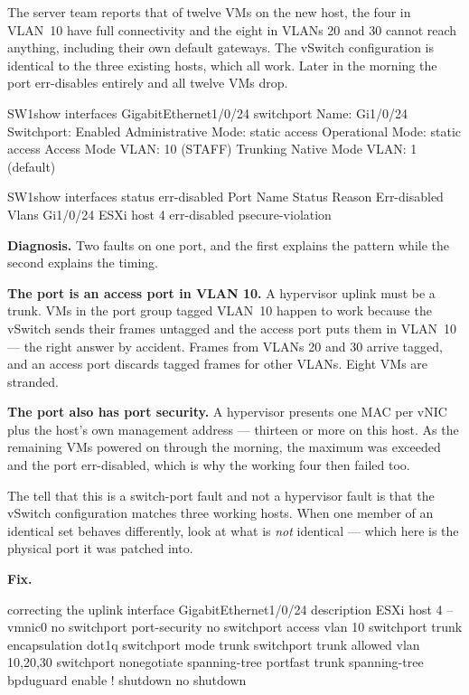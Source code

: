 \begin{breakfix}
The server team reports that of twelve VMs on the new host, the four in VLAN~10
have full connectivity and the eight in VLANs 20 and 30 cannot reach anything,
including their own default gateways. The vSwitch configuration is identical to
the three existing hosts, which all work. Later in the morning the port
err-disables entirely and all twelve VMs drop.

\begin{verify}{SW1}{show interfaces GigabitEthernet1/0/24 switchport}
Name: Gi1/0/24
Switchport: Enabled
Administrative Mode: static access
Operational Mode: static access
Access Mode VLAN: 10 (STAFF)
Trunking Native Mode VLAN: 1 (default)
\end{verify}

\begin{verify}{SW1}{show interfaces status err-disabled}
Port      Name               Status       Reason               Err-disabled Vlans
Gi1/0/24  ESXi host 4        err-disabled psecure-violation
\end{verify}

\textbf{Diagnosis.} Two faults on one port, and the first explains the pattern
while the second explains the timing.

\textbf{The port is an access port in VLAN 10.} A hypervisor uplink must be a
trunk. VMs in the port group tagged VLAN~10 happen to work because the vSwitch
sends their frames untagged and the access port puts them in VLAN~10 --- the
right answer by accident. Frames from VLANs 20 and 30 arrive tagged, and an
access port discards tagged frames for other VLANs. Eight VMs are stranded.

\textbf{The port also has port security.} A hypervisor presents one MAC per vNIC
plus the host's own management address --- thirteen or more on this host. As the
remaining VMs powered on through the morning, the maximum was exceeded and the
port err-disabled, which is why the working four then failed too.

The tell that this is a switch-port fault and not a hypervisor fault is that the
vSwitch configuration matches three working hosts. When one member of an
identical set behaves differently, look at what is \emph{not} identical --- which
here is the physical port it was patched into.

\textbf{Fix.}

\begin{config}{correcting the uplink}
interface GigabitEthernet1/0/24
 description ESXi host 4 -- vmnic0
 no switchport port-security
 no switchport access vlan 10
 switchport trunk encapsulation dot1q
 switchport mode trunk
 switchport trunk allowed vlan 10,20,30
 switchport nonegotiate
 spanning-tree portfast trunk
 spanning-tree bpduguard enable
!
 shutdown
 no shutdown
\end{config}


\end{breakfix}
